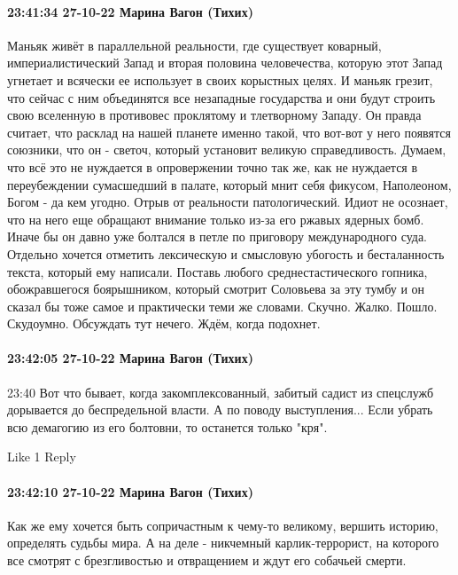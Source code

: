 \paragraph{23:41:34 27-10-22 Марина Вагон (Тихих)}

Маньяк живёт в параллельной реальности, где существует коварный, империалистический Запад и вторая половина человечества, которую этот Запад угнетает и всячески ее использует в своих корыстных целях.
И маньяк грезит, что сейчас с ним объединятся все незападные государства и они будут строить свою вселенную в противовес проклятому и тлетворному Западу.
Он правда считает, что расклад на нашей планете именно такой, что вот-вот у него появятся союзники, что он - светоч, который установит великую справедливость.
Думаем, что всё это не нуждается в опровержении точно так же, как не нуждается в переубеждении сумасшедший в палате, который мнит себя фикусом, Наполеоном, Богом - да кем угодно.
Отрыв от реальности патологический.
Идиот не осознает, что на него еще обращают внимание только из-за его ржавых ядерных бомб. Иначе бы он давно уже болтался в петле по приговору международного суда.
Отдельно хочется отметить лексическую и смысловую убогость и бесталанность текста, который ему написали.
Поставь любого среднестастического гопника, обожравшегося боярышником, который смотрит Соловьева за эту тумбу и он сказал бы тоже самое и практически теми же словами.
Скучно. Жалко. Пошло. Скудоумно. Обсуждать тут нечего.
Ждём, когда подохнет.

\paragraph{23:42:05 27-10-22 Марина Вагон (Тихих)}
23:40
Вот что бывает, когда закомплексованный, забитый садист из спецслужб дорывается до беспредельной власти.
А по поводу выступления...
Если убрать всю демагогию из его болтовни, то останется только "кря".

    Like 1
    Reply

\paragraph{23:42:10 27-10-22 Марина Вагон (Тихих)}

Как же ему хочется быть сопричастным к чему-то великому, вершить историю, определять судьбы мира.
А на деле - никчемный карлик-террорист, на которого все смотрят с брезгливостью и отвращением и ждут его собачьей смерти.



